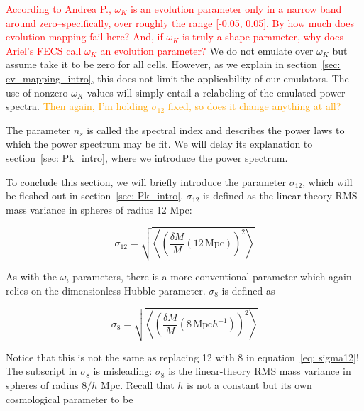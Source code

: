
\textcolor{red}{According to Andrea P., $\omega_K$ is an evolution parameter 
only in a narrow 
band around zero--specifically, over roughly the range [-0.05, 0.05].
By how much does evolution mapping fail here? And, if 
$\omega_K$ is truly a shape parameter, why does Ariel's FECS call $\omega_K$
an evolution parameter?} We do not emulate over $\omega_K$ but assume take
it to be zero for all cells. However, as we explain in
section~\ref{sec: ev_mapping_intro}, this does not limit the applicability of
our emulators. The use of nonzero $\omega_K$ values will simply entail a
relabeling of the emulated power spectra. \textcolor{orange}{Then again, I'm
holding $\sigma_{12}$ fixed, so does it change anything at all?}


The parameter $n_s$ is called the spectral index and describes the power laws
to which the power spectrum may be fit. We will delay its explanation to
section~\ref{sec: Pk_intro}, where we introduce the power spectrum.


To conclude this section, we will briefly introduce the parameter
$\sigma_{12}$, which will be fleshed out in section~\ref{sec: Pk_intro}. 
$\sigma_{12}$ is defined as the linear-theory RMS mass variance in spheres
of radius 12 Mpc:

\begin{equation}
\label{eq: sigma12}
\sigma_{12}
=
\sqrt{\left\langle \left(
	\frac{\delta M}{M} (12 \, \mathrm{Mpc})
\right)^2 \right\rangle}
\end{equation}

As with the $\omega_i$ parameters, there is a more conventional parameter
which again relies on the dimensionless Hubble parameter. $\sigma_8$ is
defined as

\begin{equation}
\sigma_8
=
\sqrt{\left\langle \left(
	\frac{\delta M}{M} (8 \, \mathrm{Mpc} h^{-1})
\right)^2 \right\rangle}
\end{equation}

Notice that this is not the same as replacing 12 with 8 in
equation~\ref{eq: sigma12}! The subscript in $\sigma_8$ is misleading:
$\sigma_{8}$ is the linear-theory RMS mass variance in spheres of radius
$8 / h$ Mpc. Recall that $h$ is not a constant but its own cosmological
parameter to be 

